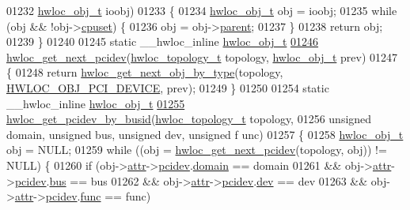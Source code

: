 \begin{DoxyCode}
01232                               \hyperlink{a00016}{hwloc_obj_t} ioobj)
01233 \{
01234   \hyperlink{a00016}{hwloc_obj_t} obj = ioobj;
01235   \textcolor{keywordflow}{while} (obj && !obj->\hyperlink{a00016_a67925e0f2c47f50408fbdb9bddd0790f}{cpuset}) \{
01236     obj = obj->\hyperlink{a00016_adc494f6aed939992be1c55cca5822900}{parent};
01237   \}
01238   \textcolor{keywordflow}{return} obj;
01239 \}
01240 
01245 \textcolor{keyword}{static} \_\_hwloc\_inline \hyperlink{a00016}{hwloc_obj_t}
\hypertarget{a00031_source_l01246}{}\hyperlink{a00064_gad6e1ed122ef3b6e098538d75acd5e3f6}{01246} \hyperlink{a00064_gad6e1ed122ef3b6e098538d75acd5e3f6}{hwloc_get_next_pcidev}(\hyperlink{a00039_ga9d1e76ee15a7dee158b786c30b6a6e38}{hwloc_topology_t} topology, \hyperlink{a00016}{hwloc_obj_t} prev)
01247 \{
01248   \textcolor{keywordflow}{return} \hyperlink{a00053_ga5f08ceb69375341e73563cfe2e77534e}{hwloc_get_next_obj_by_type}(topology, \hyperlink{a00041_ggacd37bb612667dc437d66bfb175a8dc55a5d8117a54df1fbd3606ab19e42cb0ea9}{HWLOC_OBJ_PCI_DEVICE}, prev);
01249 \}
01250 
01254 \textcolor{keyword}{static} \_\_hwloc\_inline \hyperlink{a00016}{hwloc_obj_t}
\hypertarget{a00031_source_l01255}{}\hyperlink{a00064_ga546e1d690c63fb24177f3013ed78ceb1}{01255} \hyperlink{a00064_ga546e1d690c63fb24177f3013ed78ceb1}{hwloc_get_pcidev_by_busid}(\hyperlink{a00039_ga9d1e76ee15a7dee158b786c30b6a6e38}{hwloc_topology_t} topology,
01256                           \textcolor{keywordtype}{unsigned} domain, \textcolor{keywordtype}{unsigned} bus, \textcolor{keywordtype}{unsigned} dev, \textcolor{keywordtype}{unsigned} f
      unc)
01257 \{
01258   \hyperlink{a00016}{hwloc_obj_t} obj = NULL;
01259   \textcolor{keywordflow}{while} ((obj = \hyperlink{a00064_gad6e1ed122ef3b6e098538d75acd5e3f6}{hwloc_get_next_pcidev}(topology, obj)) != NULL) \{
01260     \textcolor{keywordflow}{if} (obj->\hyperlink{a00016_accd40e29f71f19e88db62ea3df02adc8}{attr}->\hyperlink{a00017_a4203d713ce0f5beaa6ee0e9bdac70828}{pcidev}.\hyperlink{a00022_a8fba44988deb98613c1505a4019a34dc}{domain} == domain
01261         && obj->\hyperlink{a00016_accd40e29f71f19e88db62ea3df02adc8}{attr}->\hyperlink{a00017_a4203d713ce0f5beaa6ee0e9bdac70828}{pcidev}.\hyperlink{a00022_aae99e035e8d1387d7b8768aaa8eceb0a}{bus} == bus
01262         && obj->\hyperlink{a00016_accd40e29f71f19e88db62ea3df02adc8}{attr}->\hyperlink{a00017_a4203d713ce0f5beaa6ee0e9bdac70828}{pcidev}.\hyperlink{a00022_a3d70c84a12f7e93d14c8d47bf4fd9dc5}{dev} == dev
01263         && obj->\hyperlink{a00016_accd40e29f71f19e88db62ea3df02adc8}{attr}->\hyperlink{a00017_a4203d713ce0f5beaa6ee0e9bdac70828}{pcidev}.\hyperlink{a00022_a695f32df53f4ef728670bfcf31b74e0f}{func} == func)

\end{DoxyCode}
